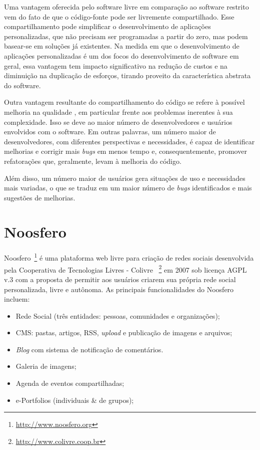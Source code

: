 
Uma vantagem oferecida pelo software livre em comparação ao software
restrito vem do fato de que o código-fonte pode ser livremente compartilhado.
%
Esse compartilhamento pode simplificar o desenvolvimento de aplicações
personalizadas, que não precisam ser programadas a partir do zero, mas
podem basear-se em soluções já existentes.
%
Na medida em que o desenvolvimento de aplicações personalizadas é um dos focos do
desenvolvimento de software em geral, essa vantagem tem impacto significativo na
redução de custos e na diminuição na duplicação de esforços, tirando proveito da
característica abstrata do software.

Outra vantagem resultante do compartilhamento do código se refere
à possível melhoria na qualidade \cite{CatedralBazzar}, em particular frente aos
problemas inerentes à sua complexidade.
%
Isso se deve ao maior número de desenvolvedores e usuários envolvidos
com o software. Em outras palavras, um número maior de desenvolvedores, com diferentes
perspectivas e necessidades, é capaz de identificar melhorias e corrigir
mais \emph{bugs} em menos tempo e, consequentemente, promover refatorações que,
geralmente, levam à melhoria do código.

%
Além disso, um número maior de usuários gera situações de uso e
necessidades mais variadas, o que se traduz em um maior número
de \emph{bugs} identificados e mais sugestões de melhorias.


\section{Noosfero}

Noosfero~\footnote{\url{http://www.noosfero.org}}
é uma  plataforma web livre para criação de redes sociais desenvolvida
pela Cooperativa de Tecnologias Livres - Colivre
~\footnote{\url{http://www.colivre.coop.br}} 
em 2007 sob licença AGPL v.3 com a proposta de permitir aos usuários criarem sua
própria rede social personalizada, livre e autônoma.
%
As principais funcionalidades do Noosfero incluem:

\begin{itemize}

\item Rede Social (três entidades: pessoas, comunidades e organizações);
\item CMS: pastas, artigos, RSS, \textit{upload} e publicação de imagens e
arquivos;
\item \textit{Blog} com sistema de notificação de comentários.
\item Galeria de imagens;
\item Agenda de eventos compartilhadas;
\item e-Portfolios (individuais \& de grupos);

\end{itemize}

